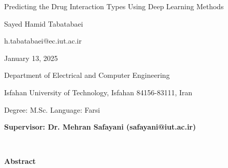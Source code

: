 \thispagestyle{empty}

\begin{latin}
\begin{center}

{\Huge Predicting the Drug Interaction Types Using Deep Learning Methods}

\vspace{1cm}

{\LARGE{Sayed Hamid Tabatabaei}}

\vspace{0.2cm}

{\small h.tabatabaei@ec.iut.ac.ir}

\vspace{0.5cm}

January 13, 2025

\vspace{0.5cm}

Department of Electrical and Computer Engineering

\vspace{0.2cm}

Isfahan University of Technology, Isfahan 84156-83111, Iran

\vspace{0.2cm}

Degree: M.Sc. \hspace*{3cm} Language: Farsi

\vspace{1cm}

{\small\textbf{Supervisor: Dr. Mehran Safayani (safayani@iut.ac.ir)}}
\end{center}
~\vfill



\noindent\textbf{Abstract}

\begin{small}
\baselineskip=0.6cm


\end{small}
\end{latin}
